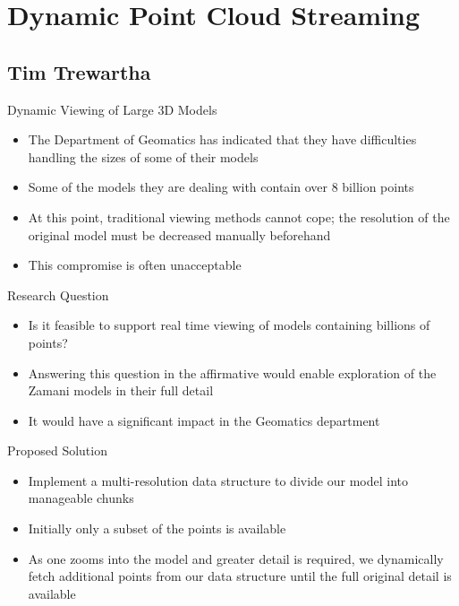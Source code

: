 \documentclass{beamer}
\begin{document}
{
 {
    \vfill
    \vskip2pt%
    \vskip2pt%

}

\section{Dynamic Point Cloud Streaming}
\subsection{Tim Trewartha}
\begin{frame}{Dynamic Viewing of Large 3D Models}
\begin{itemize}
\item The Department of Geomatics has indicated that they have difficulties
  handling the sizes of some of their models
\item Some of the models they are dealing with contain over 8 billion points
\item At this point, traditional viewing methods cannot cope; the resolution
  of the original model must be decreased manually beforehand
\item This compromise is often unacceptable
\end{itemize}
\end{frame}


\begin{frame}{Research Question}
\begin{itemize}
\item Is it feasible to support real time viewing of models containing
  billions of points?
\item Answering this question in the affirmative would enable exploration
  of the Zamani models in their full detail
\item It would have a significant impact in the Geomatics department
\end{itemize}
\end{frame}

\begin{frame}{Proposed Solution}

\begin{itemize}
\item Implement a multi-resolution data structure to divide our model into
  manageable chunks
\item Initially only a subset of the points is available
\item As one zooms into the model and greater detail is required, we dynamically
  fetch additional points from our data structure until the full original
  detail is available
\end{itemize}
\end{frame}


}
\end{document}
